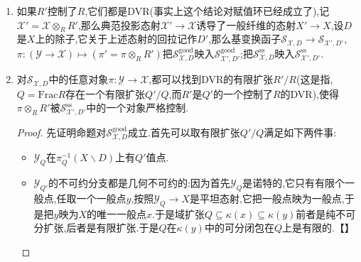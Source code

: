 \begin{enumerate}
\begin{enumerate}[(1)]
\begin{proof}
    		任取$\mathrm{S}_{\mathcal{X},D}^{\mathrm{ss}}$的对象$\pi:\mathcal{Y}\to\mathcal{X}$.那么$\lambda:\mathcal{Y}\to\mathrm{Spec}R$是平坦的并且几何纤维总是既约的,于是按照【EGAIII.7.8.6】知$\lambda$是零维上同调平坦的,也即$\lambda_*\mathscr{O}_{\mathcal{Y}}$关于任意基变换$T\to\mathrm{Spec}R$都可交换.按照$\lambda$是紧合态射,有$\lambda_*\mathscr{O}_{\mathcal{Y}}$是$\mathrm{Spec}R$上的凝聚层,于是它是一个有限$R$模$M$的伴随模层.按照$\mathcal{Y}$是整概形,这个模是无挠的,但是PID上有限无挠模是自由模,于是存在正整数$r$满足$\lambda_*\mathscr{O}_{\mathcal{Y}}=\mathscr{O}_{\mathrm{Spec}R}^r$.但是按照$\mathcal{Y}_Q$是一维的,就有$r=1$【?】.综上得到$\lambda_*\mathscr{O}_{\mathcal{Y}}=\mathscr{O}_{\mathrm{Spec}R}$是关于任意基变换成立的.
    	\end{proof}
        \item 如果$R'$控制了$R$,它们都是DVR(事实上这个结论对赋值环已经成立了),记$\mathcal{X}'=\mathcal{X}\otimes_RR'$,那么典范投影态射$\mathcal{X}'\to\mathcal{X}$诱导了一般纤维的态射$X'\to X$,设$D$是$X$上的除子,它关于上述态射的回拉记作$D'$,那么基变换函子$\mathcal{S}_{\mathcal{X},D}\to\mathcal{S}_{\mathcal{X}',D'}$,$\pi:\left(\mathcal{Y}\to\mathcal{X}\right)\mapsto\left(\pi'=\pi\otimes_RR'\right)$把$\mathcal{S}_{\mathcal{X},D}^{\mathrm{good}}$映入$\mathcal{S}_{\mathcal{X}',D'}^{\mathrm{good}}$;把$\mathcal{S}_{\mathcal{X},D}^{\mathrm{ss}}$映入$\mathcal{S}_{\mathcal{X}',D'}^{\mathrm{ss}}$.
        \item 对$\mathcal{S}_{\mathcal{X},D}$中的任意对象$\pi:\mathcal{Y}\to\mathcal{X}$,都可以找到DVR的有限扩张$R'/R$(这是指,$Q=\mathrm{Frac}R$存在一个有限扩张$Q'/Q$,而$R'$是$Q'$的一个控制了$R$的DVR),使得$\pi\otimes_RR'$被$\mathcal{S}_{\mathcal{X}',D'}^{\mathrm{ss}}$中的一个对象严格控制.
        \begin{proof}
        	
        	先证明命题对$\mathcal{S}_{\mathcal{X},D}^{\mathrm{good}}$成立.首先可以取有限扩张$Q'/Q$满足如下两件事:
        	\begin{itemize}
        		\item $\mathcal{Y}_Q$在$\pi_Q^{-1}(X\backslash D)$上有$Q'$值点.                                                                                                                                                                                          
        		\item $\mathcal{Y}_{Q'}$的不可约分支都是几何不可约的:因为首先$\mathcal{Y}_Q$是诺特的,它只有有限个一般点,任取一个一般点$y$,按照$\mathcal{Y}_Q\to X$是平坦态射,它把一般点映为一般点,于是把$y$映为$X$的唯一一般点$x$.于是域扩张$Q\subseteq\kappa(x)\subseteq\kappa(y)$前者是纯不可分扩张,后者是有限扩张.于是$Q$在$\kappa(y)$中的可分闭包在$Q$上是有限的.【】
        	\end{itemize}
        	

\end{proof}
\end{enumerate}
\end{enumerate}
